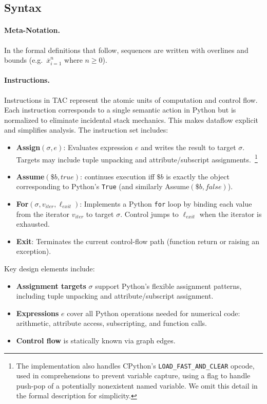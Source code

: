 \subsection{Syntax}

\paragraph{Meta-Notation.}
In the formal definitions that follow, sequences are written with overlines and bounds (e.g.\ $\overline{x}_{i=1}^{n}$ where $n \geq 0$).

\paragraph{Instructions.}
Instructions in TAC represent the atomic units of computation and control flow.
Each instruction corresponds to a single semantic action in Python but is normalized
to eliminate incidental stack mechanics. This makes dataflow explicit and simplifies
analysis. The instruction set includes:
\begin{itemize}
    \item \textbf{\textsf{Assign}$(\sigma, e)$}: Evaluates expression $e$ and writes the result to target $\sigma$. Targets may include tuple unpacking and attribute/subscript assignments.~\footnote{The implementation also handles CPython's \texttt{LOAD\_FAST\_AND\_CLEAR} opcode, used in comprehensions to prevent variable capture, using a flag to handle push-pop of a potentially nonexistent named variable. We omit this detail in the formal description for simplicity.}
    \item \textbf{\textsf{Assume}$(\$b, true)$}: continues execution iff $\$b$ is exactly the object corresponding to Python's \texttt{True} (and similarly \textsf{Assume}$(\$b, false)$).
    \item \textbf{\textsf{For}$(\sigma, v_{\mathit{iter}}, \ell_{\mathit{exit}})$}: Implements a Python \texttt{for} loop by binding each value from the iterator $v_{\mathit{iter}}$ to target $\sigma$. Control jumps to $\ell_{\mathit{exit}}$ when the iterator is exhausted.
    \item \textbf{\textsf{Exit}}: Terminates the current control-flow path (function return or raising an exception).
\end{itemize}

Key design elements include:
\begin{itemize}
    \item \textbf{Assignment targets} $\sigma$ support Python's flexible assignment patterns, including tuple unpacking and attribute/subscript assignment.
    \item \textbf{Expressions} $e$ cover all Python operations needed for numerical code: arithmetic, attribute access, subscripting, and function calls.
    \item \textbf{Control flow} is statically known via graph edges.
\end{itemize}

